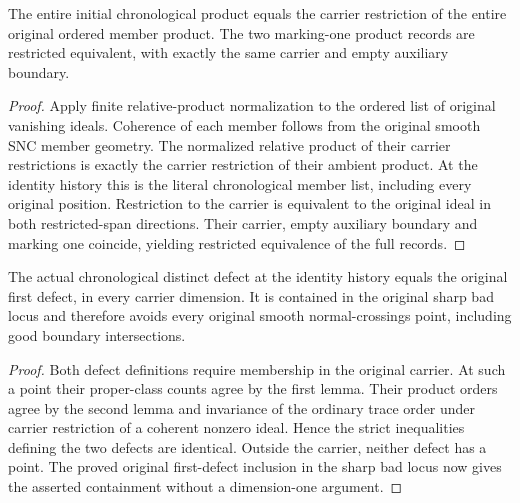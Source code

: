 \begin{lemma}
\label{hir:sharp-actual-initial-product-source-restriction}
The entire initial chronological product equals the carrier restriction of the
entire original ordered member product. The two marking-one product records
are restricted equivalent, with exactly the same carrier and empty auxiliary
boundary.
\end{lemma}
\begin{proof}
Apply finite relative-product normalization to the ordered list of original
vanishing ideals. Coherence of each member follows from the original smooth
SNC member geometry. The normalized relative product of their carrier
restrictions is exactly the carrier restriction of their ambient product.
At the identity history this is the literal chronological member list,
including every original position. Restriction to the carrier is equivalent
to the original ideal in both restricted-span directions. Their carrier,
empty auxiliary boundary and marking one coincide, yielding restricted
equivalence of the full records.
\leanok
\end{proof}

\begin{theorem}
\label{hir:sharp-actual-initial-defect-source-equality}
The actual chronological distinct defect at the identity history equals the
original first defect, in every carrier dimension. It is contained in the
original sharp bad locus and therefore avoids every original smooth
normal-crossings point, including good boundary intersections.
\end{theorem}
\begin{proof}
Both defect definitions require membership in the original carrier. At such
a point their proper-class counts agree by the first lemma. Their product
orders agree by the second lemma and invariance of the ordinary trace order
under carrier restriction of a coherent nonzero ideal. Hence the strict
inequalities defining the two defects are identical. Outside the carrier,
neither defect has a point. The proved original first-defect inclusion in the
sharp bad locus now gives the asserted containment without a dimension-one
argument.
\leanok
\end{proof}

